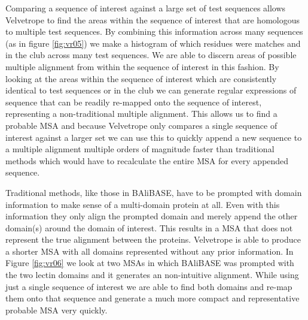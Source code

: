 \documentclass[phd,tocprelim]{cornell}
\begin{document}
Comparing a sequence of interest against a large set of test sequences allows Velvetrope to find the areas within the sequence of interest that are homologous to multiple test sequences. By combining this information across many sequences (as in figure \ref{fig:vr05}) we make a histogram of which residues were matches and in the club across many test sequences. We are able to discern areas of possible multiple alignment from within the sequence of interest in this fashion. By looking at the areas within the sequence of interest which are consistently identical to test sequences or in the club we can generate regular expressions of sequence that can be readily re-mapped onto the sequence of interest, representing a non-traditional multiple alignment.  This allows us to find a probable MSA and because Velvetrope only compares a single sequence of interest against a larger set we can use this to quickly append a new sequence to a multiple alignment multiple orders of magnitude faster than traditional methods which would have to recalculate the entire MSA for every appended sequence.

Traditional methods, like those in BAliBASE, have to be prompted with domain information to make sense of a multi-domain protein at all. Even with this information they only align the prompted domain and merely append the other domain(s) around the domain of interest. This results in a MSA that does not represent the true alignment between the proteins. Velvetrope is able to produce a shorter MSA with all domains represented without any prior information. In Figure \ref{fig:vr06} we look at two MSAs in which BAliBASE was prompted with the two lectin domains and it generates an non-intuitive alignment. While using just a single sequence of interest we are able to find both domains and re-map them onto that sequence and generate a much more compact and representative probable MSA very quickly.
\end{document}
